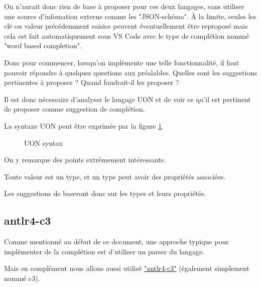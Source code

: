 \documentclass[
    iict, %
    il, %
]{heig-tb}
\begin{document}
On n'aurait donc rien de base à proposer pour ces deux langages, sans utiliser une source d'infomation externe comme les "JSON-schéma".
À la limite, seules les clé ou valeur précédemment saisies peuvent éventuellement être reproposé mais cela est fait automatiquement sous VS Code
avec le type de complétion nommé "word based completion".

Donc pour commencer, lorsqu'on implémente une telle fonctionnalité, il faut pouvoir répondre à quelques questions aux préalables.
Quelles sont les suggestions pertinentes à proposer ? Quand faudrait-il les proposer ?

Il est donc nécessaire d'analyser le langage UON et de voir ce qu'il est pertinent de proposer comme suggestion de complétion.

La syntaxe UON peut être exprimée par la figure \ref{syntax}.

\begin{figure}[!ht]
    \begin{center}
    \end{center}
    \caption[syntax]{\label{syntax} UON syntax}
\end{figure}

On y remarque des points extrêmement intéressants.

Toute valeur est un type, et un type peut avoir des propriétés associées.

Les suggestions de baseront donc sur les types et leurs propriétés.

\subsection{antlr4-c3}

Comme mentionné au début de ce document, une approche typique pour implémenter de la complétion est d'utiliser un parser du langage.

Mais en complément nous allons aussi utilisé \href{https://github.com/mike-lischke/antlr4-c3}{"antlr4-c3"} (également simplement nommé c3).
\end{document}

